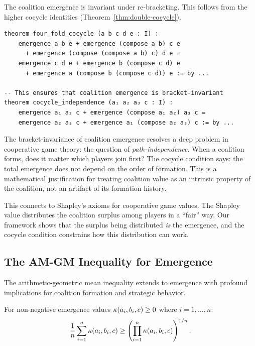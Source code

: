 \begin{theorem}
\label{thm:coalition-invariance}
The coalition emergence is invariant under re-bracketing. This follows from
the higher cocycle identities (Theorem~\ref{thm:double-cocycle}).
\end{theorem}

\begin{lstlisting}[caption={Coalition structure via higher cocycles (IDT\_v3\_Emergence.lean)}]
theorem four_fold_cocycle (a b c d e : I) :
    emergence a b e + emergence (compose a b) c e
      + emergence (compose (compose a b) c) d e =
    emergence c d e + emergence b (compose c d) e
      + emergence a (compose b (compose c d)) e := by ...

-- This ensures that coalition emergence is bracket-invariant
theorem cocycle_independence (a₁ a₂ a₃ c : I) :
    emergence a₁ a₂ c + emergence (compose a₁ a₂) a₃ c =
    emergence a₂ a₃ c + emergence a₁ (compose a₂ a₃) c := by ...
\end{lstlisting}

\begin{interpretation}
The bracket-invariance of coalition emergence resolves a deep problem in
cooperative game theory: the question of \emph{path-independence}. When a
coalition forms, does it matter which players join first? The cocycle condition
says: the total emergence does not depend on the order of formation. This is
a mathematical justification for treating coalition value as an intrinsic
property of the coalition, not an artifact of its formation history.

This connects to Shapley's axioms for cooperative game values. The Shapley value
distributes the coalition surplus among players in a ``fair'' way. Our framework
shows that the surplus being distributed \emph{is} the emergence, and the cocycle
condition constrains how this distribution can work.
\end{interpretation}

\subsection{The AM-GM Inequality for Emergence}

The arithmetic-geometric mean inequality extends to emergence with profound
implications for coalition formation and strategic behavior.

\begin{theorem}
\label{thm:emergence-amgm}
For non-negative emergence values $\kappa(a_i, b_i, c) \geq 0$ where $i = 1, \ldots, n$:
\[
  \frac{1}{n} \sum_{i=1}^n \kappa(a_i, b_i, c) \geq
  \left( \prod_{i=1}^n \kappa(a_i, b_i, c) \right)^{1/n}.
\]
\end{theorem}

